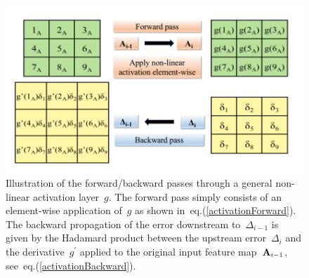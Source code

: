 \documentclass{article}
\newcommand{\centerwithin}[2]{%
  {\mathmakebox[\widthof{\ensuremath{{}#2{}}}][c]{{#1}}}}
\newcommand{\mathcolorbox}[2]{\colorbox{#1}{$\displaystyle #2$}}
\begin{document}
\begin{figure}[hb]
\centering
\includegraphics[width=0.85\linewidth]{pptx/activation/Slide2.png}
\caption{Illustration of the forward/backward passes through a general non-linear activation layer~$g$.  The forward pass simply consists of an element-wise application of~$g$ as shown in~eq.(\ref{activationForward}). The backward propagation of the error downstream to~$\Delta_{i-1}$ is given by the Hadamard product between the upstream error~$\Delta_{i}$ and the derivative~$g^\prime$ applied to the original input feature map~${\bf A}_{i-1}$, see~eq.(\ref{activationBackward}).}
\label{fig:activation}
\end{figure}

\newcommand\tempboxActivation{%
\begin{minipage}{0.2\textwidth}%
\abovedisplayskip=0pt
\belowdisplayskip=0pt
\begin{align*}
\Delta_i \cdot \text{d}{\bf A}_{i} &= \Delta_i \cdot \text{d} g \left( {\bf A}_{i-1} \right) \\
&\centerwithin{\downarrow}{=} \colorbox{light-blue}{using eq.~\eqref{scalarToScalar}} \\
&= \Delta_i \cdot \left( g^\prime \left( {\bf A}_{i-1} \right) \circ \text{d}  {\bf A}_{i-1} \right) \\
&\centerwithin{\downarrow}{=} \colorbox{light-blue}{using eq.~\eqref{frobenius2}} \\
& = \mathcolorbox{shadecolor}{\Delta_i \circ g^\prime \left( {\bf A}_{i-1} \right) } \cdot \text{d} {\bf A}_{i-1}
\end{align*}
\end{minipage}}
\end{document}
